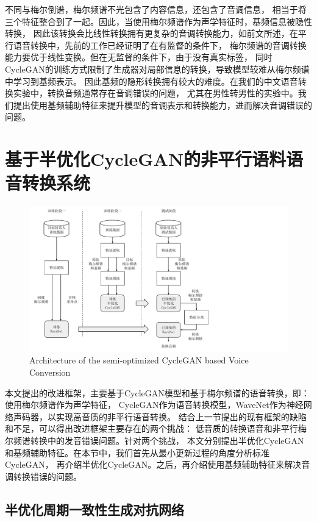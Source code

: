 不同与梅尔倒谱，梅尔频谱不光包含了内容信息，还包含了音调信息，
相当于将三个特征整合到了一起。因此，当使用梅尔频谱作为声学特征时，基频信息被隐性转换，
因此该转换会比线性转换拥有更复杂的音调转换能力，如前文所述，在平行语音转换中，先前的工作已经证明了在有监督的条件下，
梅尔频谱的音调转换能力要优于线性变换。但在无监督的条件下，由于没有真实标签，
同时CycleGAN的训练方式限制了生成器对局部信息的转换，导致模型较难从梅尔频谱中学习到基频表示。
因此基频的隐形转换拥有较大的难度。在我们的中文语音转换实验中，转换音频通常存在音调错误的问题，
尤其在男性转男性的实验中。我们提出使用基频辅助特征来提升模型的音调表示和转换能力，进而解决音调错误的问题。

\section{基于半优化CycleGAN的非平行语料语音转换系统}

\begin{figure}[!htp]
    \centering
    \includegraphics[width=12cm,trim=0 10 200 0,clip]{figure/4_proposedarch.pdf}
    {Architecture of the semi-optimized CycleGAN based Voice Conversion}
    \label{fig:proposedarch}
\end{figure}

本文提出的改进框架，主要基于CycleGAN模型和基于梅尔频谱的语音转换，即：使用梅尔频谱作为声学特征，
CycleGAN作为语音转换模型，WaveNet作为神经网络声码器，以实现高音质的非平行语音转换。
结合上一节提出的现有框架的缺陷和不足，可以得出改进框架主要存在的两个挑战：
低音质的转换语音和非平行梅尔频谱转换中的发音错误问题。针对两个挑战，
本文分别提出半优化CycleGAN和基频辅助特征。在本节中，我们首先从最小更新过程的角度分析标准CycleGAN，
再介绍半优化CycleGAN。之后，再介绍使用基频辅助特征来解决音调转换错误的问题。

\subsection{半优化周期一致性生成对抗网络}

